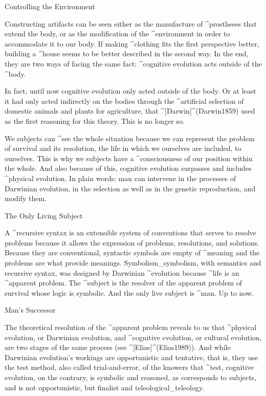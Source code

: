 \Section Controlling the Environment

Constructing artifacts can be seen either as the manufacture of
^{prostheses} that extend the body, or as the modification of the
^{environment} in order to accommodate it to our body. If making
^{clothing} fits the first perspective better, building a ^{house} seems
to be better described in the second way. In the end, they are two ways
of facing the same fact: ^{cognitive evolution} acts outside of the
^{body}.


In fact, until now cognitive evolution only acted outside of the body.
Or at least it had only acted indirectly on the bodies through the
^{artificial selection} of domestic animals and plants for agriculture,
that ^[Darwin]^(Darwin1859) used as the first reasoning for this theory.
This is no longer so.

We subjects can ^{see} the whole situation because we can represent the
problem of survival and its resolution, the life in which we ourselves
are included, to ourselves. This is why we subjects have a
^{consciousness} of our position within the whole. And also because of
this, cognitive evolution surpasses and includes ^{physical evolution}.
In plain words: man can intervene in the processes of Darwinian
evolution, in the selection as well as in the genetic reproduction, and
modify them.


\Section The Only Living Subject

A ^{recursive syntax} is an extensible system of conventions that serves
to resolve problems because it allows the expression of problems,
resolutions, and solutions. Because they are conventional, syntactic
symbols are empty of ^{meaning} and the problems are what provide
meanings. Symbolism_{symbolism}, with semantics and recursive syntax,
was designed by Darwinian ^{evolution} because ^{life} is an ^{apparent
problem}. The ^{subject} is the resolver of the apparent problem of
survival whose logic is symbolic. And the only live subject is ^{man}.
Up to now.


\Section Man's Successor

The theoretical resolution of the ^{apparent problem} reveals to us that
^{physical evolution}, or Darwinian evolution, and ^{cognitive
evolution}, or cultural evolution, are two stages of the same process
(see ^[Elias]^(Elias1989)). And while Darwinian evolution's workings are
opportunistic and tentative, that is, they use the test method, also
called trial-and-error, of the knowers that ^{test}, cognitive
evolution, on the contrary, is symbolic and reasoned, as corresponds to
subjects, and is not opportunistic, but finalist and
teleological_{teleology}.

